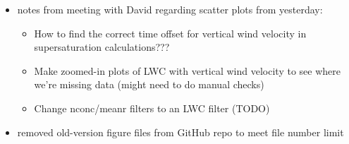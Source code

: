 \documentclass{article}
\begin{document}
\begin{itemize}
\begin{itemize}
		\item notes from meeting with David regarding scatter plots from yesterday:
		\begin{itemize}
			\item How to find the correct time offset for vertical wind velocity in supersaturation calculations???
			\item Make zoomed-in plots of LWC with vertical wind velocity to see where we're missing data (might need to do manual checks)
			\item Change nconc/meanr filters to an LWC filter (TODO)
		\end{itemize}
		\item removed old-version figure files from GitHub repo to meet file number limit
	\end{itemize}
\end{itemize}
\end{document}
